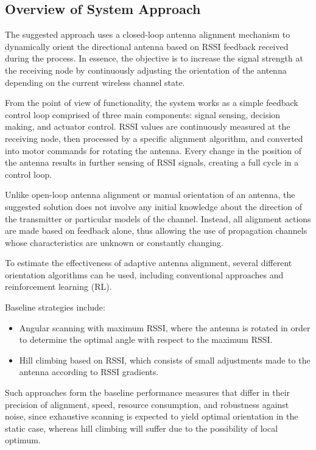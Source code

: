 
\subsection{Overview of System Approach}

The suggested approach uses a closed-loop antenna alignment mechanism to dynamically orient the directional antenna based on RSSI feedback received during the process. In essence, the objective is to increase the signal strength at the receiving node by continuously adjusting the orientation of the antenna depending on the current wireless channel state.

From the point of view of functionality, the system works as a simple feedback control loop comprised of three main components: signal sensing, decision making, and actuator control. RSSI values are continuously measured at the receiving node, then processed by a specific alignment algorithm, and converted into motor commands for rotating the antenna. Every change in the position of the antenna results in further sensing of RSSI signals, creating a full cycle in a control loop.

Unlike open-loop antenna alignment or manual orientation of an antenna, the suggested solution does not involve any initial knowledge about the direction of the transmitter or particular models of the channel. Instead, all alignment actions are made based on feedback alone, thus allowing the use of propagation channels whose characteristics are unknown or constantly changing.

To estimate the effectiveness of adaptive antenna alignment, several different orientation algorithms can be used, including conventional approaches and reinforcement learning (RL).

Baseline strategies include:
\begin{itemize}
    \item Angular scanning with maximum RSSI, where the antenna is rotated in order to determine the optimal angle with respect to the maximum RSSI.
    \item Hill climbing based on RSSI, which consists of small adjustments made to the antenna according to RSSI gradients.
\end{itemize}

Such approaches form the baseline performance measures that differ in their precision of alignment, speed, resource consumption, and robustness against noise, since exhaustive scanning is expected to yield optimal orientation in the static case, whereas hill climbing will suffer due to the possibility of local optimum.

